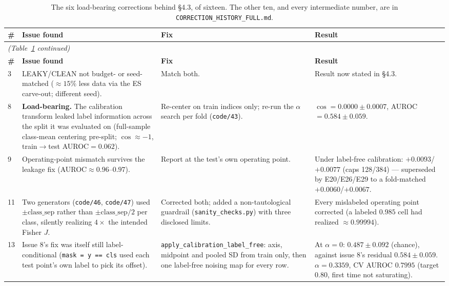 \documentclass[10pt]{article} %
\begin{document}
\small
\begin{longtable}{@{}p{}p{}p{}p{}@{}}
\caption{The six load-bearing corrections behind §4.3, of sixteen. The other ten, and every intermediate number, are in \texttt{CORRECTION\_HISTORY\_FULL.md}.}
\label{tab:appendixA-sixteen}\\
\toprule
\textbf{\#} & \textbf{Issue found} & \textbf{Fix} & \textbf{Result} \\
\midrule
\endfirsthead
\multicolumn{4}{l}{\textit{(Table~\ref{tab:appendixA-sixteen} continued)}}\\
\toprule
\textbf{\#} & \textbf{Issue found} & \textbf{Fix} & \textbf{Result} \\
\midrule
\endhead
\bottomrule
\endlastfoot

3 & LEAKY/CLEAN not budget- or seed-matched ($\approx15\%$ less data via the ES carve-out; different seed). & Match both. & Result now stated in §4.3. \\

8 & \textbf{Load-bearing.} The calibration transform leaked label information across the split it was evaluated on (full-sample class-mean centering pre-split; $\cos\approx-1$, train$\to$test AUROC$=0.062$). & Re-center on train indices only; re-run the $\alpha$ search per fold (\texttt{code/43}). & $\cos=0.0000\pm0.0007$, AUROC$=0.584\pm0.059$. \\

9 & Operating-point mismatch survives the leakage fix (AUROC$\approx0.96$--$0.97$). & Report at the test's own operating point. & Under label-free calibration: $+0.0093$/$+0.0077$ (caps 128/384) --- superseded by E20/E26/E29 to a fold-matched $+0.0060$/$+0.0067$. \\

11 & Two generators (\texttt{code/46}, \texttt{code/47}) used $\pm\text{class\_sep}$ rather than $\pm\text{class\_sep}/2$ per class, silently realizing $4\times$ the intended Fisher $J$. & Corrected both; added a non-tautological guardrail (\texttt{sanity\_checks.py}) with three disclosed limits. & Every mislabeled operating point corrected (a labeled $0.985$ cell had realized $\approx0.99994$). \\

13 & Issue 8's fix was itself still label-conditional (\texttt{mask = y == cls} used each test point's own label to pick its offset). & \texttt{apply\_calibration\_label\_free}: axis, midpoint and pooled SD from train only, then one label-free noising map for every row. & At $\alpha=0$: $0.487\pm0.092$ (chance), against issue 8's residual $0.584\pm0.059$. $\alpha=0.3359$, CV AUROC $0.7995$ (target $0.80$, first time not saturating). \\


\end{longtable}
\end{document}
